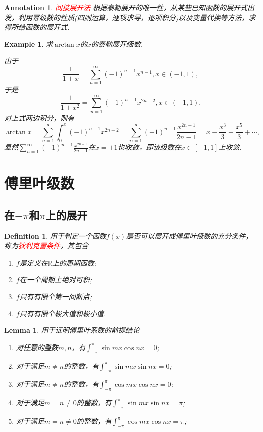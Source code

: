 \documentclass{article}
\newtheorem{lemma}[theorem]{Lemma}
\newtheorem{example}[theorem]{Example}
\newtheorem{definition}[theorem]{Definition}
\newtheorem{annotation}[theorem]{Annotation}
\newcommand{\redt}[1]{\textcolor{red}{#1}}
\begin{document}
\begin{annotation}
\rm \redt{间接展开法} 根据泰勒展开的唯一性，从某些已知函数的展开式出发，利用幂级数的性质(四则运算，逐项求导，逐项积分)以及变量代换等方法，求得所给函数的展开式.
\end{annotation}

\begin{example}
\rm 求$\arctan x$的$x$的泰勒展开级数.

\rm 由于
$$
\frac{1}{1+x} = \sum\limits_{n=1}^{\infty} (-1)^{n-1}x^{n-1}, x \in (-1,1), 
$$
于是
$$
\frac{1}{1+x^2} = \sum\limits_{n=1}^{\infty} (-1)^{n-1}x^{2n-2}, x \in (-1,1). 
$$
对上式两边积分，则有
$$
\arctan x = \sum\limits_{n=1}^{\infty} \int_0^{x} (-1)^{n-1}x^{2n-2}  =   \sum\limits_{n=1}^{\infty}(-1)^{n-1}\frac{x^{2n-1}}{2n-1} = x - \frac{x^3}{3} + \frac{x^5}{3} + \cdots,
$$
显然$\sum\limits_{n=1}^{\infty}(-1)^{n-1}\frac{x^{2n-1}}{2n-1}$在$x = \pm 1$也收敛，即该级数在$x \in [-1,1]$上收敛. 
\end{example}


\newpage
\section{傅里叶级数}
\subsection{在$-\pi$和$\pi$上的展开}


\begin{definition}
\rm 用于判定一个函数$f(x)$是否可以展开成傅里叶级数的充分条件，称为\redt{狄利克雷条件}，其包含
\begin{enumerate}
	\item $f$是定义在$\mathbb{R}$上的周期函数;
	\item $f$在一个周期上绝对可积;
	\item $f$只有有限个第一间断点;
	\item $f$只有有限个极大值和极小值. 
\end{enumerate}
\end{definition}


\begin{lemma}
\rm 用于证明傅里叶系数的前提结论
\begin{enumerate}
	\item 对任意的整数$m,n$，有$\int_{-\pi}^{\pi} \sin mx\cos nx = 0$;
	\item 对于满足$m \neq n$的整数，有$\int_{-\pi}^{\pi} \sin mx\sin nx = 0$;
	\item 对于满足$m \neq n$的整数，有$\int_{-\pi}^{\pi} \cos mx\cos nx = 0$;
	\item 对于满足$m = n \neq 0$的整数，有$\int_{-\pi}^{\pi} \sin mx\sin nx = \pi$;
	\item 对于满足$m = n \neq 0$的整数，有$\int_{-\pi}^{\pi} \cos mx\cos nx = \pi$;
\end{enumerate}
\end{lemma}
\end{document}
